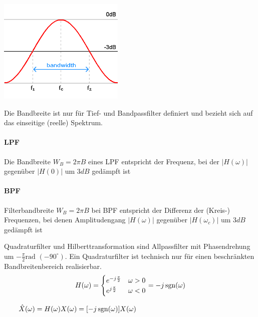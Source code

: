 \begin{minipage}{7cm}
	\includegraphics[width=6cm]{bilder/filter_bandbreite.png}
\end{minipage}
\begin{minipage}{11cm}
	Die Bandbreite ist nur für Tief- und Bandpassfilter definiert und bezieht sich auf das einseitige (reelle) Spektrum.
	\paragraph{LPF}	Die Bandbreite $W_B = 2 \pi B$ eines LPF entspricht der Frequenz, bei der $|H(\omega)|$ gegenüber $|H(0)|$ um $3 dB$ gedämpft ist
	\paragraph{BPF}	Filterbandbreite $W_B = 2 \pi B$ bei BPF entspricht der Differenz der (Kreis-) Frequenzen, bei denen Amplitudengang $|H(\omega)|$ gegenüber $|H(\omega_c)|$ um
	$3 dB$ gedämpft ist
\end{minipage}


\label{lti_quadratur}\label{lti_hilbert}
Quadraturfilter und Hilberttransformation sind Allpassfilter mit
Phasendrehung um $-\frac{\pi}{2}\text{rad } (-90^\circ)$. Ein
Quadraturfilter ist technisch nur für einen beschränkten
Bandbreitenbereich realisierbar.
\[
H(\omega) = \begin{cases}
             	e^{-j \frac{\pi}{2}} & \omega > 0 \\
             	e^{j \frac{\pi}{2}} & \omega < 0
             \end{cases} =
-j \operatorname{sgn}(\omega)
\]

$\qquad \hat{X}(\omega) = H(\omega)X(\omega) = [-j \operatorname{sgn}(\omega)] X(\omega)$